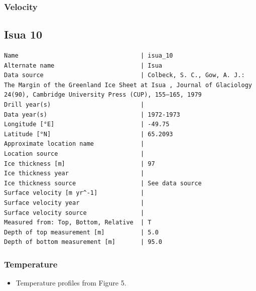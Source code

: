 \documentclass[article,a4paper,times,11pt,twoside]{article}
\begin{document}
\subsubsection{Velocity}
\label{sec:org1373771}
\clearpage
\subsection{Isua 10}
\label{sec:org0e4e556}
\begin{verbatim}
Name                                  | isua_10
Alternate name                        | Isua
Data source                           | Colbeck, S. C., Gow, A. J.: The Margin of the Greenland Ice Sheet at Isua , Journal of Glaciology 24(90), Cambridge University Press (CUP), 155–165, 1979 
Drill year(s)                         | 
Data year(s)                          | 1972-1973
Longitude [°E]                        | -49.75
Latitude [°N]                         | 65.2093
Approximate location name             | 
Location source                       | 
Ice thickness [m]                     | 97
Ice thickness year                    | 
Ice thickness source                  | See data source
Surface velocity [m yr^-1]            | 
Surface velocity year                 | 
Surface velocity source               | 
Measured from: Top, Bottom, Relative  | T
Depth of top measurement [m]          | 5.0
Depth of bottom measurement [m]       | 95.0
\end{verbatim}

\subsubsection{Temperature}
\label{sec:org1ed0a61}

\begin{itemize}
\item Temperature profiles from \textcite{colbeck_1979} Figure 5.
\end{itemize}
\end{document}

